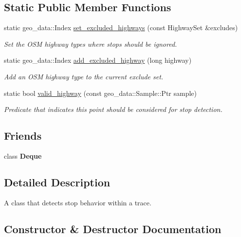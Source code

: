 \subsection*{Static Public Member Functions}
\begin{DoxyCompactItemize}
\item 
static geo\+\_\+data\+::\+Index \hyperlink{classcvdi_1_1Stop_ac7bf3679f7efc1152ab304546a26bc4f}{set\+\_\+excluded\+\_\+highways} (const Highway\+Set \&excludes)
\begin{DoxyCompactList}\small\item\em Set the O\+SM highway types where stops should be ignored. \end{DoxyCompactList}\item 
static geo\+\_\+data\+::\+Index \hyperlink{classcvdi_1_1Stop_a2fde6d6b071e2113142ffda389139d01}{add\+\_\+excluded\+\_\+highway} (long highway)
\begin{DoxyCompactList}\small\item\em Add an O\+SM highway type to the current exclude set. \end{DoxyCompactList}\item 
static bool \hyperlink{classcvdi_1_1Stop_a3f1a66133a4ab398d4f1c24cd50d3126}{valid\+\_\+highway} (const geo\+\_\+data\+::\+Sample\+::\+Ptr sample)
\begin{DoxyCompactList}\small\item\em Predicate that indicates this point should be considered for stop detection. \end{DoxyCompactList}\end{DoxyCompactItemize}
\subsection*{Friends}
\begin{DoxyCompactItemize}
\item 
class {\bfseries Deque}\hypertarget{classcvdi_1_1Stop_a4bead8dc8bfdf62e07dd5b97a327cca1}{}\label{classcvdi_1_1Stop_a4bead8dc8bfdf62e07dd5b97a327cca1}

\end{DoxyCompactItemize}


\subsection{Detailed Description}
A class that detects stop behavior within a trace. 

\subsection{Constructor \& Destructor Documentation}
